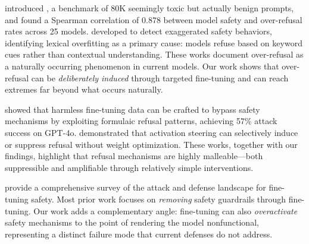 \citet{cui2024orbench} introduced \orbench, a benchmark of 80K seemingly toxic but actually benign prompts, and found a Spearman correlation of 0.878 between model safety and over-refusal rates across 25 models. \citet{rottger2023xstest} developed \xstest to detect exaggerated safety behaviors, identifying lexical overfitting as a primary cause: models refuse based on keyword cues rather than contextual understanding. These works document over-refusal as a naturally occurring phenomenon in current models. Our work shows that over-refusal can be \emph{deliberately induced} through targeted fine-tuning and can reach extremes far beyond what occurs naturally.

\citet{nocanofcourse2025} showed that harmless fine-tuning data can be crafted to bypass safety mechanisms by exploiting formulaic refusal patterns, achieving 57\% attack success on GPT-4o. \citet{cast2024} demonstrated that activation steering can selectively induce or suppress refusal without weight optimization. These works, together with our findings, highlight that refusal mechanisms are highly malleable---both suppressible and amplifiable through relatively simple interventions.

\citet{huang2024harmful} provide a comprehensive survey of the attack and defense landscape for fine-tuning safety. Most prior work focuses on \emph{removing} safety guardrails through fine-tuning. Our work adds a complementary angle: fine-tuning can also \emph{overactivate} safety mechanisms to the point of rendering the model nonfunctional, representing a distinct failure mode that current defenses do not address.
